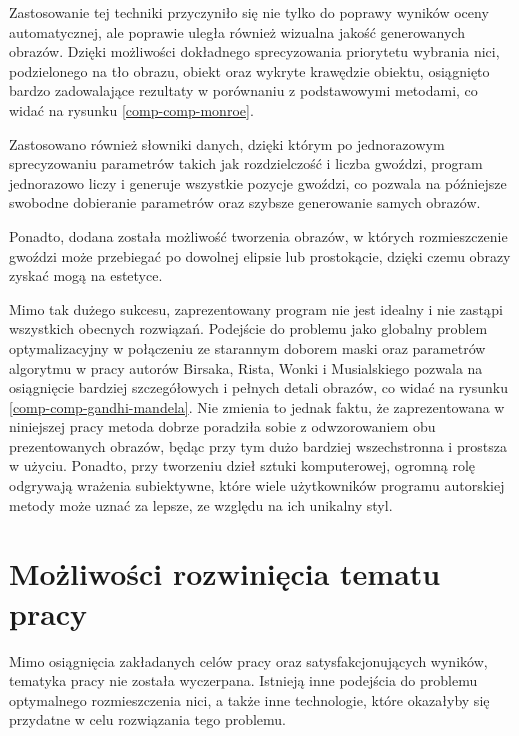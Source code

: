     Zastosowanie tej techniki przyczyniło się nie tylko do poprawy wyników oceny automatycznej, ale poprawie uległa również wizualna jakość generowanych obrazów. Dzięki możliwości dokładnego sprecyzowania priorytetu wybrania nici, podzielonego na tło obrazu, obiekt oraz wykryte krawędzie obiektu, osiągnięto bardzo zadowalające rezultaty w porównaniu z podstawowymi metodami, co widać na rysunku \ref{comp-comp-monroe}.
    
    Zastosowano również słowniki danych, dzięki którym po jednorazowym sprecyzowaniu parametrów takich jak rozdzielczość i liczba gwoździ, program jednorazowo liczy i generuje wszystkie pozycje gwoździ, co pozwala na późniejsze swobodne dobieranie parametrów oraz szybsze generowanie samych obrazów.
    
    Ponadto, dodana została możliwość tworzenia obrazów, w których rozmieszczenie gwoździ może przebiegać po dowolnej elipsie lub prostokącie, dzięki czemu obrazy zyskać mogą na estetyce.
    
    Mimo tak dużego sukcesu, zaprezentowany program nie jest idealny i nie zastąpi wszystkich obecnych rozwiązań. Podejście do problemu jako globalny problem optymalizacyjny w połączeniu ze starannym doborem maski oraz parametrów algorytmu w pracy autorów Birsaka, Rista, Wonki i Musialskiego pozwala na osiągnięcie bardziej szczegółowych i pełnych detali obrazów, co widać na rysunku \ref{comp-comp-gandhi-mandela}. Nie zmienia to jednak faktu, że zaprezentowana w niniejszej pracy metoda dobrze poradziła sobie z odwzorowaniem obu prezentowanych obrazów, będąc przy tym dużo bardziej wszechstronna i prostsza w użyciu. Ponadto, przy tworzeniu dzieł sztuki komputerowej, ogromną rolę odgrywają wrażenia subiektywne, które wiele użytkowników programu autorskiej metody może uznać za lepsze, ze względu na ich unikalny styl.
    
    \section{Możliwości rozwinięcia tematu pracy}
    Mimo osiągnięcia zakładanych celów pracy oraz satysfakcjonujących wyników, tematyka pracy nie została wyczerpana. Istnieją inne podejścia do problemu optymalnego rozmieszczenia nici, a także inne technologie, które okazałyby się przydatne w celu rozwiązania tego problemu. 
    
